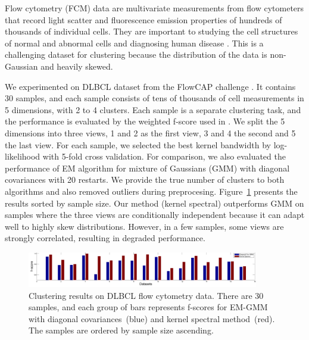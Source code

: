 
Flow cytometry (FCM) data are multivariate measurements from flow cytometers that record light scatter and fluorescence emission properties of hundreds of thousands of individual cells. They are important to studying the cell structures of normal and abnormal cells and diagnosing human disease \cite{cytometry_nature}. This is a challenging dataset for clustering because the distribution of the data is non-Gaussian and heavily skewed.

We experimented on DLBCL dataset from the FlowCAP challenge \cite{cytometry_nature}. It contains 30 samples, and each sample consists of tens of thousands of cell measurements in 5 dimensions, with 2 to 4 clusters. Each sample is a separate clustering task, and the performance is evaluated by the weighted f-score used in \cite{cytometry_nature}. We split the 5 dimensions into three views, 1 and 2 as the first view, 3 and 4 the second and 5 the last view. For each sample, we selected the best kernel bandwidth by log-likelihood with 5-fold cross validation. For comparison, we also evaluated the performance of EM algorithm for mixture of Gaussians (GMM) with diagonal covariances with 20 restarts. We provide the true number of clusters to both algorithms and also removed outliers during preprocesing. Figure~\ref{fig:real_data} presents the results sorted by sample size. Our method (kernel spectral) outperforms GMM on samples where the three views are conditionally independent because it can adapt well to highly skew distributions. However, in a few samples, some views are strongly correlated, resulting in degraded performance. 


\begin{figure}
  \centering
  \includegraphics[width=0.9\textwidth]{../experiment/figure/paired_bar_chat_better} 
   \vspace{-3mm}
  \caption{Clustering results on DLBCL flow cytometry data. There are 30 samples, and each group of bars represents f-scores for EM-GMM with diagonal covariances~(blue) and kernel spectral method~(red). The samples are ordered by sample size ascending.}\label{fig:real_data}
  \vspace{-3mm}
\end{figure}

